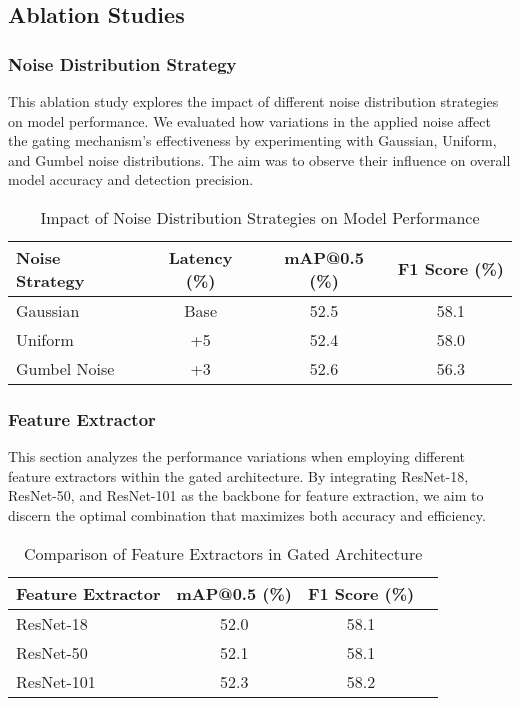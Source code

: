 \subsection{Ablation Studies}

\subsubsection{Noise Distribution Strategy}

This ablation study explores the impact of different noise distribution strategies on model performance. We evaluated how variations in the applied noise affect the gating mechanism's effectiveness by experimenting with Gaussian, Uniform, and Gumbel noise distributions. The aim was to observe their influence on overall model accuracy and detection precision.

\begin{table}[ht]
    \centering
    \caption{Impact of Noise Distribution Strategies on Model Performance}
    \label{tab:noise_distribution}
    \begin{tabular}{@{}lccc@{}}
    \toprule
    Noise Strategy & Latency (\%) & mAP@0.5 (\%) & F1 Score (\%) \\ 
    \midrule
    Gaussian & Base & 52.5 & 58.1 \\
    Uniform & +5 & 52.4 & 58.0 \\
    Gumbel Noise & +3 & 52.6 & 56.3 \\
    \bottomrule
    \end{tabular}
\end{table}
    

\subsubsection{Feature Extractor}

This section analyzes the performance variations when employing different feature extractors within the gated architecture. By integrating ResNet-18, ResNet-50, and ResNet-101 as the backbone for feature extraction, we aim to discern the optimal combination that maximizes both accuracy and efficiency.

\begin{table}[ht]
    \centering
    \caption{Comparison of Feature Extractors in Gated Architecture}
    \label{tab:feature_extractor}
    \begin{tabular}{@{}lccc@{}}
    \toprule
    Feature Extractor & mAP@0.5 (\%) & F1 Score (\%) \\ 
    \midrule
    ResNet-18 & 52.0 & 58.1 \\
    ResNet-50 & 52.1 & 58.1 \\
    ResNet-101 & 52.3 & 58.2 \\
    \bottomrule
    \end{tabular}
\end{table}
    

